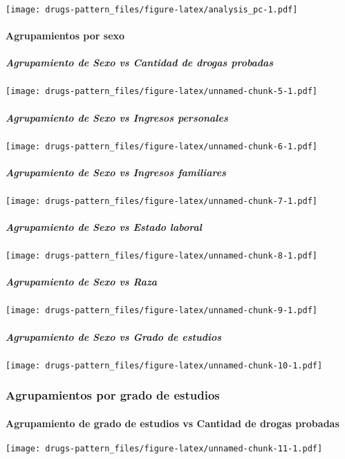 \documentclass[]{article}
\let\oldparagraph\paragraph
\renewcommand{\paragraph}[1]{\oldparagraph{#1}\mbox{}}
\let\oldsubparagraph\subparagraph
\renewcommand{\subparagraph}[1]{\oldsubparagraph{#1}\mbox{}}
\begin{document}
\texttt{[image: drugs-pattern\_files/figure-latex/analysis\_pc-1.pdf]}

\paragraph{Agrupamientos por sexo}\label{agrupamientos-por-sexo}

\subparagraph{Agrupamiento de Sexo vs Cantidad de drogas
probadas}\label{agrupamiento-de-sexo-vs-cantidad-de-drogas-probadas}

\texttt{[image: drugs-pattern\_files/figure-latex/unnamed-chunk-5-1.pdf]}

\subparagraph{Agrupamiento de Sexo vs Ingresos
personales}\label{agrupamiento-de-sexo-vs-ingresos-personales}

\texttt{[image: drugs-pattern\_files/figure-latex/unnamed-chunk-6-1.pdf]}

\subparagraph{Agrupamiento de Sexo vs Ingresos
familiares}\label{agrupamiento-de-sexo-vs-ingresos-familiares}

\texttt{[image: drugs-pattern\_files/figure-latex/unnamed-chunk-7-1.pdf]}

\subparagraph{Agrupamiento de Sexo vs Estado
laboral}\label{agrupamiento-de-sexo-vs-estado-laboral}

\texttt{[image: drugs-pattern\_files/figure-latex/unnamed-chunk-8-1.pdf]}

\subparagraph{Agrupamiento de Sexo vs
Raza}\label{agrupamiento-de-sexo-vs-raza}

\texttt{[image: drugs-pattern\_files/figure-latex/unnamed-chunk-9-1.pdf]}

\subparagraph{Agrupamiento de Sexo vs Grado de
estudios}\label{agrupamiento-de-sexo-vs-grado-de-estudios}

\texttt{[image: drugs-pattern\_files/figure-latex/unnamed-chunk-10-1.pdf]}

\subsubsection{Agrupamientos por grado de
estudios}\label{agrupamientos-por-grado-de-estudios}

\paragraph{Agrupamiento de grado de estudios vs Cantidad de drogas
probadas}\label{agrupamiento-de-grado-de-estudios-vs-cantidad-de-drogas-probadas}

\texttt{[image: drugs-pattern\_files/figure-latex/unnamed-chunk-11-1.pdf]}
\end{document}
